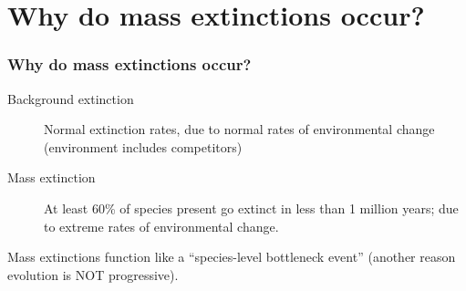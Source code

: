 {
\begin{frame}[t,plain]
    \begin{adjustwidth}{-2em}{-1.5em}
    \end{adjustwidth}
\end{frame}
}

{
\begin{frame}[t,plain]
    \begin{adjustwidth}{-2em}{-1.5em}
    \end{adjustwidth}
\end{frame}
}

{
\begin{frame}[t,plain]
    \begin{adjustwidth}{-2em}{-1.5em}
    \end{adjustwidth}
\end{frame}
}

\section[Why do mass extinctions occur?]{Why do mass extinctions occur?}

\begin{noheadline}
\begin{frame}[t]
    \frametitle{Why do mass extinctions occur?}
    \begin{adjustwidth}{-2em}{-1.5em}

        \begin{description}
            \item[Background extinction]
                Normal extinction rates, due to normal rates of
                environmental change (environment includes competitors)

            \vspace{4mm}
            \item[Mass extinction]
                At least 60\% of species present go extinct in less than 1
                million years; due to extreme rates of environmental
                change.
        \end{description}

        \vspace{4mm}
        Mass extinctions function like a ``species-level bottleneck event''
        (another reason evolution is NOT progressive).

    \end{adjustwidth}
\end{frame}
\end{noheadline}

